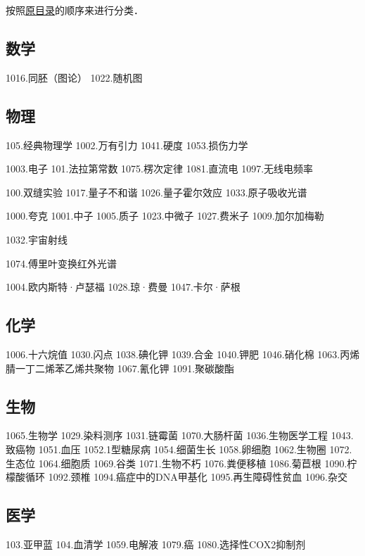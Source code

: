 
\begin{issues}
\issueDraft
\end{issues}

按照\href{https://wuli.wiki/assets/sogou}{原目录}的顺序来进行分类．

\subsection{数学}

1016.同胚（图论）
1022.随机图

\subsection{物理}

105.经典物理学
1002.万有引力
1041.硬度
1053.损伤力学

1003.电子
101.法拉第常数
1075.楞次定律
1081.直流电
1097.无线电频率

100.双缝实验
1017.量子不和谐
1026.量子霍尔效应
1033.原子吸收光谱

1000.夸克
1001.中子
1005.质子
1023.中微子
1027.费米子
1009.加尔加梅勒

1032.宇宙射线

1074.傅里叶变换红外光谱

1004.欧内斯特·卢瑟福
1028.琼·费曼
1047.卡尔·萨根

\subsection{化学}
1006.十六烷值
1030.闪点
1038.碘化钾
1039.合金
1040.钾肥
1046.硝化棉
1063.丙烯腈一丁二烯苯乙烯共聚物
1067.氰化钾
1091.聚碳酸酯

\subsection{生物}
1065.生物学
1029.染料测序
1031.链霉菌
1070.大肠杆菌
1036.生物医学工程
1043.致癌物
1051.血压
1052.1型糖尿病
1054.细菌生长
1058.卵细胞
1062.生物圈
1072.生态位
1064.细胞质
1069.谷类
1071.生物不朽
1076.粪便移植
1086.菊苣根
1090.柠檬酸循环
1092.颈椎
1094.癌症中的DNA甲基化
1095.再生障碍性贫血
1096.杂交

\subsection{医学}
103.亚甲蓝
104.血清学
1059.电解液
1079.癌
1080.选择性COX2抑制剂

